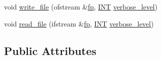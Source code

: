 \begin{DoxyCompactItemize}
\item 
void \mbox{\hyperlink{classflag__orbit__node_a7d66eaacd4ca6b238ad0fe7d58886112}{write\+\_\+file}} (ofstream \&\mbox{\hyperlink{k__arc__lifting_8_c_a67cc9fbd0817c2d140368e5ed1f2a44d}{fp}}, \mbox{\hyperlink{galois_8h_a09fddde158a3a20bd2dcadb609de11dc}{I\+NT}} \mbox{\hyperlink{simeon_8_c_a818073fbcc2f439e7c56952f67386122}{verbose\+\_\+level}})
\item 
void \mbox{\hyperlink{classflag__orbit__node_af6cfd0a35302543f30c04e95bce83bc4}{read\+\_\+file}} (ifstream \&\mbox{\hyperlink{k__arc__lifting_8_c_a67cc9fbd0817c2d140368e5ed1f2a44d}{fp}}, \mbox{\hyperlink{galois_8h_a09fddde158a3a20bd2dcadb609de11dc}{I\+NT}} \mbox{\hyperlink{simeon_8_c_a818073fbcc2f439e7c56952f67386122}{verbose\+\_\+level}})
\end{DoxyCompactItemize}
\subsection*{Public Attributes}
